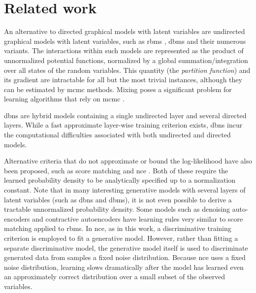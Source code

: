 \section{Related work}

An alternative to directed graphical models with latent variables are undirected graphical models with latent variables, such as \acrfull{rbms} \cite{27_10.7551/mitpress/5236.003.0009,16_10.1162/neco.2006.18.7.1527}, \acrfull{dbms} \cite{26_salakhutdinov2009deep} and their numerous variants. The interactions within such models are represented as the product of unnormalized potential functions, normalized by a global summation/integration over all states of the random variables. This quantity (the \emph{partition function}) and its gradient are intractable for all but the most trivial instances, although they can be estimated by \acrfull{mcmc} methods. Mixing poses a significant problem for learning algorithms that rely on \acrshort{mcmc} \cite{3_pmlr-v28-bengio13,5_bengio2014deepgenerativestochasticnetworks}.

\noindent \acrfull{dbns} \cite{16_10.1162/neco.2006.18.7.1527} are hybrid models containing a single undirected layer and several directed layers. While a fast approximate layer-wise training criterion exists, \acrshort{dbns} incur the computational difficulties associated with both undirected and directed models.

\noindent Alternative criteria that do not approximate or bound the log-likelihood have also been proposed, such as score matching \cite{18_JMLR:v6:hyvarinen05a} and \acrfull{nce} \cite{13_pmlr-v9-gutmann10a}. Both of these require the learned probability density to be analytically specified up to a normalization constant. Note that in many interesting generative models with several layers of latent variables (such as \acrshort{dbns} and \acrshort{dbms}), it is not even possible to derive a tractable unnormalized probability density. Some models such as denoising auto-encoders \cite{30_vincent2008extracting} and contractive autoencoders have learning rules very similar to score matching applied to \acrshort{rbms}. In \acrshort{nce}, as in this work, a discriminative training criterion is employed to ﬁt a generative model. However, rather than fitting a separate discriminative model, the generative model itself is used to discriminate generated data from samples a fixed noise distribution. Because \acrshort{nce} uses a fixed noise distribution, learning slows dramatically after the model has learned even an approximately correct distribution over a small subset of the observed variables.

